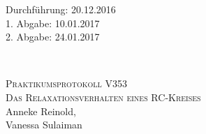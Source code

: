 



\begin{titlepage}
  \begin{flushleft}
 Durchführung: 20.12.2016\\
 1. Abgabe: 10.01.2017\\
 2. Abgabe: 24.01.2017
  \end{flushleft}


\HRule\\[1,0cm]

 \begin{center}


\textsc{\LARGE Praktikumsprotokoll V353}\\[1.5cm]
\textsc{\huge Das Relaxationsverhalten eines RC-Kreises} \\[5,5cm]

Anneke Reinold\footnotemark[1], \\
Vanessa Sulaiman\footnotemark[2] \\[1,0cm]



 \end{center}
\HRule

 \vfill

\end{titlepage}


 \newpage



\printbibliography


